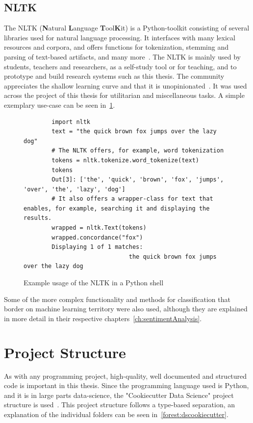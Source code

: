\subsection{NLTK}
\label{subsec:nltk}

The NLTK (\textbf{N}atural \textbf{L}anguage \textbf{T}ool\textbf{K}it) is a Python-toolkit consisting of several libraries used for
natural language processing.
It interfaces with many lexical resources and corpora, and offers functions for tokenization, stemming and parsing of text-based artifacts,
and many more~\cite{nltkDocs}.
The NLTK is mainly used by students, teachers and researchers, as a self-study tool or for teaching,
and to prototype and build research systems such as this thesis.
The community appreciates the shallow learning curve and that it is unopinionated~\cite{Bird2006}.
It was used across the project of this thesis for utilitarian and miscellaneous tasks.
A simple exemplary use-case can be seen in~\ref{code:nltk}.

\begin{figure}
    \caption{Example usage of the NLTK in a Python shell}
    \label{code:nltk}
    \begin{verbatim}
        import nltk
        text = "the quick brown fox jumps over the lazy dog"
        # The NLTK offers, for example, word tokenization
        tokens = nltk.tokenize.word_tokenize(text)
        tokens
        Out[3]: ['the', 'quick', 'brown', 'fox', 'jumps', 'over', 'the', 'lazy', 'dog']
        # It also offers a wrapper-class for text that enables, for example, searching it and displaying the results.
        wrapped = nltk.Text(tokens)
        wrapped.concordance("fox")
        Displaying 1 of 1 matches:
                              the quick brown fox jumps over the lazy dog
    \end{verbatim}
\end{figure}

Some of the more complex functionality and methods for classification that border on machine learning territory were also used,
although they are explained in more detail in their respective chapters~\ref{ch:sentimentAnalysis}.

\section{Project Structure}
\label{sec:projectStructure}

As with any programming project, high-quality, well documented and structured code is important in this thesis.
Since the programming language used is Python, and it is in large parts data-science,
the "Cookiecutter Data Science" project structure is used~\cite{dsCookieCutter}.
This project structure follows a type-based separation, an explanation of the individual folders can be seen in~\ref{forest:dscookiecutter}.


